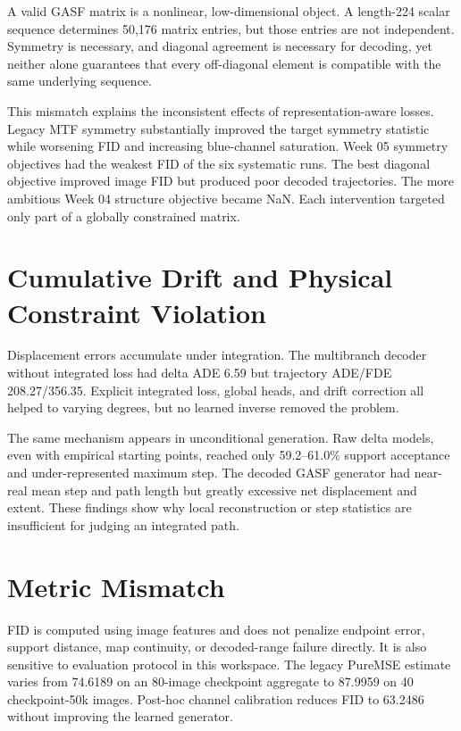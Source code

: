 \documentclass[12pt,a4paper,oneside]{report}
\begin{document}
A valid GASF matrix is a nonlinear, low-dimensional object. A length-224 scalar sequence determines 50,176 matrix entries, but those entries are not independent. Symmetry is necessary, and diagonal agreement is necessary for decoding, yet neither alone guarantees that every off-diagonal element is compatible with the same underlying sequence.

This mismatch explains the inconsistent effects of representation-aware losses. Legacy MTF symmetry substantially improved the target symmetry statistic while worsening FID and increasing blue-channel saturation. Week 05 symmetry objectives had the weakest FID of the six systematic runs. The best diagonal objective improved image FID but produced poor decoded trajectories. The more ambitious Week 04 structure objective became NaN. Each intervention targeted only part of a globally constrained matrix.

\section{Cumulative Drift and Physical Constraint Violation}

Displacement errors accumulate under integration. The multibranch decoder without integrated loss had delta ADE 6.59 but trajectory ADE/FDE 208.27/356.35. Explicit integrated loss, global heads, and drift correction all helped to varying degrees, but no learned inverse removed the problem.

The same mechanism appears in unconditional generation. Raw delta models, even with empirical starting points, reached only 59.2--61.0\% support acceptance and under-represented maximum step. The decoded GASF generator had near-real mean step and path length but greatly excessive net displacement and extent. These findings show why local reconstruction or step statistics are insufficient for judging an integrated path.

\section{Metric Mismatch}

FID is computed using image features and does not penalize endpoint error, support distance, map continuity, or decoded-range failure directly. It is also sensitive to evaluation protocol in this workspace. The legacy PureMSE estimate varies from 74.6189 on an 80-image checkpoint aggregate to 87.9959 on 40 checkpoint-50k images. Post-hoc channel calibration reduces FID to 63.2486 without improving the learned generator.
\end{document}

